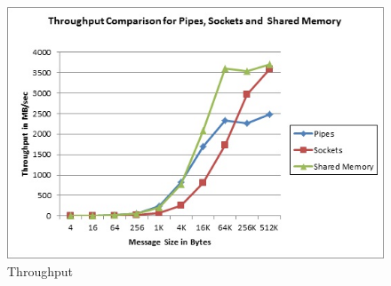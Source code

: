\begin{figure}
  \includegraphics[width=\linewidth]{graphs/tpt.jpg}
  \caption{Throughput} 
  \label{fig:tpt}
\end{figure}


